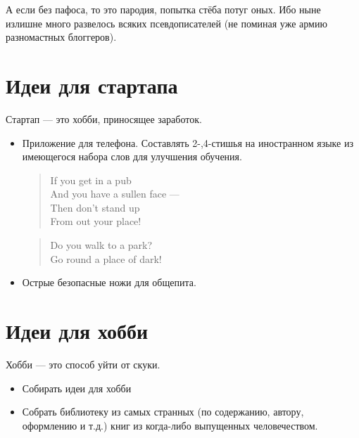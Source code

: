 \documentclass[12pt,a4paper]{article}
\begin{document}
 А если без пафоса, то это пародия, попытка стёба потуг оных. Ибо ныне излишне много развелось всяких псевдописателей (не поминая уже армию разномастных блоггеров).
\newpage
\section*{Идеи для стартапа}
Стартап --- это хобби, приносящее заработок.
\begin{itemize}
\item Приложение для телефона. Составлять 2-,4-стишья на иностранном языке из имеющегося набора слов для улучшения обучения.\\
\begin{flushleft}
\begin{verse}
If you get in a pub\\
And you have a sullen face ---\\ 
Then don't stand up\\
From out your place!
\end{verse}

\begin{verse}
Do you walk to a park?\\
Go round a place of dark! 
\end{verse}
\end{flushleft}
\item Острые безопасные ножи для общепита.
\end{itemize}
\newpage
\section*{Идеи для хобби}
Хобби --- это способ уйти от скуки.
\begin{itemize}
\item Собирать идеи для хобби
\item Собрать библиотеку из самых странных (по содержанию, автору, оформлению и т.д.) книг из когда-либо выпущенных человечеством.
\end{itemize}
\newpage
\end{document}
